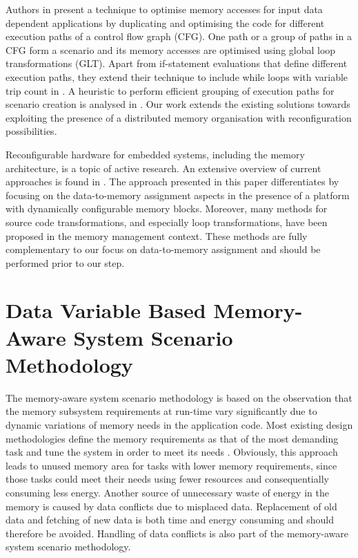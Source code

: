 \documentclass{acm_proc_article-sp}
\begin{document}
Authors in \cite{Pal06} present a technique to optimise memory accesses for input data dependent applications by duplicating and optimising the code for different execution paths of a control flow graph (CFG). One path or a group of paths in a CFG form a scenario and its memory accesses are optimised using global loop transformations (GLT). Apart from if-statement evaluations that define different execution paths, they extend their technique to include while loops with variable trip count in \cite{Pal06b}. A heuristic to perform efficient grouping of execution paths for scenario creation is analysed in \cite{Pal07}. Our work extends the existing solutions towards exploiting the presence of a distributed memory organisation with reconfiguration possibilities.

Reconfigurable hardware for embedded systems, including the memory architecture, is a topic of active research. An extensive overview of current approaches is found in \cite{Garcia}. The approach presented in this paper differentiates by focusing on the data-to-memory assignment aspects in the presence of a platform with dynamically configurable memory blocks. Moreover, many methods for source code transformations, and especially loop transformations, have been proposed in the memory management context. These methods are fully complementary to our focus on data-to-memory assignment and should be performed prior to our step. 

\section{Data Variable Based Memory-Aware System Scenario Methodology}
\label{sec:methodology}

The memory-aware system scenario methodology is based on the observation that the memory subsystem requirements at run-time vary significantly due to dynamic variations of memory needs in the application code. Most existing design methodologies define the memory requirements as that of the most demanding task and tune the system in order to meet its needs \cite{tcm}. Obviously, this approach leads to unused memory area for tasks with lower memory requirements, since those tasks could meet their needs using fewer resources and consequentially consuming less energy. Another source of unnecessary waste of energy in the memory is caused by data conflicts due to misplaced data. Replacement of old data and fetching of new data is both time and energy consuming and should therefore be avoided. Handling of data conflicts is also part of the  memory-aware system scenario methodology.
\end{document}
